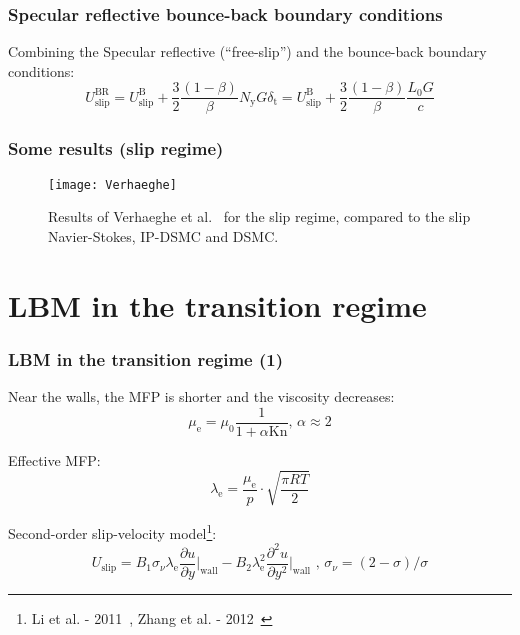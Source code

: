 \documentclass{beamer}
\begin{document}
\begin{frame}
 \frametitle{Specular reflective bounce-back boundary conditions}
 Combining the Specular reflective (``free-slip'') and the bounce-back boundary conditions:
\begin{equation}
 U_\mathrm{slip}^\mathrm{BR} = U_\mathrm{slip}^\mathrm{B} + \frac{3}{2} \frac{(1-\beta)}{\beta} N_\mathrm{y} G \delta_\mathrm{t}
 = U_\mathrm{slip}^\mathrm{B} + \frac{3}{2} \frac{(1-\beta)}{\beta} \frac{L_0 G}{c}
\end{equation}
\end{frame}

\begin{frame}
 \frametitle{Some results (slip regime)}
 \begin{figure}
  \texttt{[image: Verhaeghe]}
  \caption{Results of Verhaeghe et al.~\cite{Verhaeghe2009} for the slip regime, compared to the slip Navier-Stokes, IP-DSMC and DSMC.}
 \end{figure}
\end{frame}

\section{LBM in the transition regime}

\begin{frame}
 \frametitle{LBM in the transition regime (1)}
 
 Near the walls, the MFP is shorter and the viscosity decreases:
 \begin{equation}
 \mu_\mathrm{e} = \mu_0 \frac{1}{1 + \alpha \mathrm{Kn}} \textrm{, \ } \alpha \approx 2
\end{equation}
 
 Effective MFP:
 \begin{equation}
 \lambda_\mathrm{e} = \frac{\mu_\mathrm{e}}{p} \cdot \sqrt{\frac{\pi R T}{2}}
 \end{equation}
 
 Second-order slip-velocity model\footnote{Li et al. - 2011~\cite{Li2011}, Zhang et al. - 2012~\cite{Zhang2012}}:
 \begin{equation}
 U_\mathrm{slip} = B_1 \sigma_\nu \lambda_\mathrm{e} \frac{\partial u}{\partial y} \Big|_\mathrm{wall} - B_2 \lambda_\mathrm{e}^2 \frac{\partial^2 u}{\partial y^2} \Big|_\mathrm{wall} \textrm{ , \ } \sigma_\nu = (2 - \sigma)/\sigma
  \label{eq:slip2}
 \end{equation} 
\end{frame}
\end{document}
